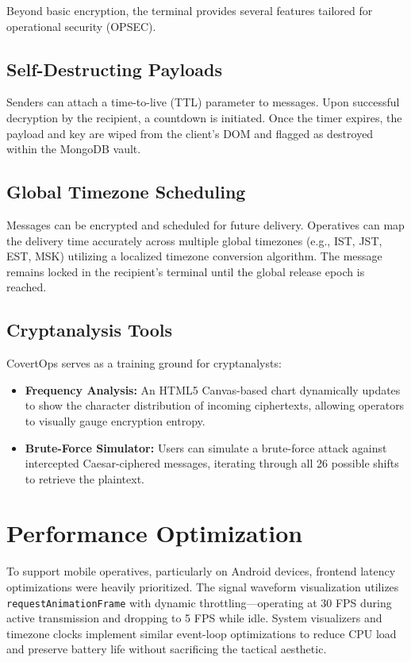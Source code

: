 \documentclass[conference]{IEEEtran}
\begin{document}
Beyond basic encryption, the terminal provides several features tailored for operational security (OPSEC).

\subsection{Self-Destructing Payloads}
Senders can attach a time-to-live (TTL) parameter to messages. Upon successful decryption by the recipient, a countdown is initiated. Once the timer expires, the payload and key are wiped from the client's DOM and flagged as destroyed within the MongoDB vault.

\subsection{Global Timezone Scheduling}
Messages can be encrypted and scheduled for future delivery. Operatives can map the delivery time accurately across multiple global timezones (e.g., IST, JST, EST, MSK) utilizing a localized timezone conversion algorithm. The message remains locked in the recipient's terminal until the global release epoch is reached.

\subsection{Cryptanalysis Tools}
CovertOps serves as a training ground for cryptanalysts:
\begin{itemize}
    \item \textbf{Frequency Analysis:} An HTML5 Canvas-based chart dynamically updates to show the character distribution of incoming ciphertexts, allowing operators to visually gauge encryption entropy.
    \item \textbf{Brute-Force Simulator:} Users can simulate a brute-force attack against intercepted Caesar-ciphered messages, iterating through all 26 possible shifts to retrieve the plaintext.
\end{itemize}

\section{Performance Optimization}

To support mobile operatives, particularly on Android devices, frontend latency optimizations were heavily prioritized. The signal waveform visualization utilizes \texttt{requestAnimationFrame} with dynamic throttling—operating at 30 FPS during active transmission and dropping to 5 FPS while idle. System visualizers and timezone clocks implement similar event-loop optimizations to reduce CPU load and preserve battery life without sacrificing the tactical aesthetic.
\end{document}
